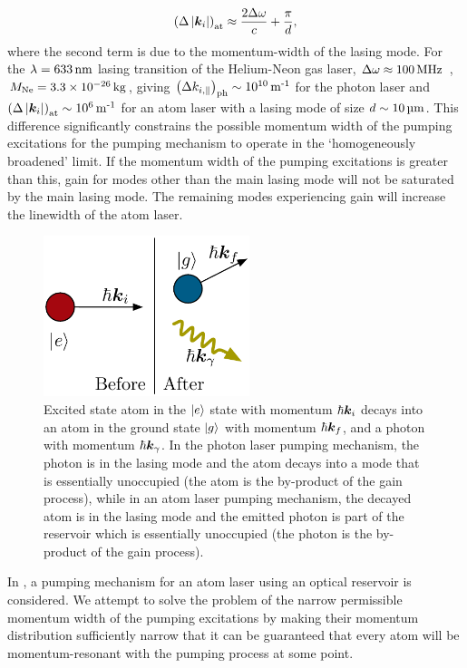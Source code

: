 \begin{align*}
    \left(\Delta \left|\bm{k}_{i}\right|\right)_\text{at} \approx \frac{2 \Delta\omega}{c} + \frac{\pi}{d},
\end{align*}
where the second term is due to the momentum-width of the lasing mode.  For the $\lambda = \unit[633]{nm}$ lasing transition of the Helium-Neon gas laser, $\Delta\omega \approx \unit[100]{MHz}$ \citep{SiegmanLasers}, $M_\text{Ne} = 3.3 \times \unit[10^{-26}]{kg}$, giving $\left(\Delta k_{i,\parallel}\right)_\text{ph} \sim \unit[10^{10}]{m\textsuperscript{-1}}$ for the photon laser and $\left(\Delta \abs{\vect{k}_{i}}\right)_\text{at} \sim \unit[10^{6}]{m\textsuperscript{-1}}$ for an atom laser with a lasing mode of size $d \sim \unit[10]{\micro m}$.  This difference significantly constrains the possible momentum width of the pumping excitations for the pumping mechanism to operate in the `homogeneously broadened' limit.  If the momentum width of the pumping excitations is greater than this, gain for modes other than the main lasing mode will not be saturated by the main lasing mode.  The remaining modes experiencing gain will increase the linewidth of the atom laser.

\begin{figure}
    \centering
    \includegraphics[width=6cm]{AtomDecay}
    \caption{
        \label{Introduction:AtomDecay}
        Excited state atom in the ${\left|e\right>}$ state with momentum $\hbar \bm{k}_i$ decays into an atom in the ground state ${\left|g\right>}$ with momentum $\hbar \bm{k}_f$, and a photon with momentum $\hbar \bm{k}_\gamma$.  In the photon laser pumping mechanism, the photon is in the lasing mode and the atom decays into a mode that is essentially unoccupied (the atom is the by-product of the gain process), while in an atom laser pumping mechanism, the decayed atom is in the lasing mode and the emitted photon is part of the reservoir which is essentially unoccupied (the photon is the by-product of the gain process).
    }
\end{figure}

In , a pumping mechanism for an atom laser using an optical reservoir is considered.  We attempt to solve the problem of the narrow permissible momentum width of the pumping excitations by making their momentum distribution sufficiently narrow that it can be guaranteed that every atom will be momentum-resonant with the pumping process at some point.  

